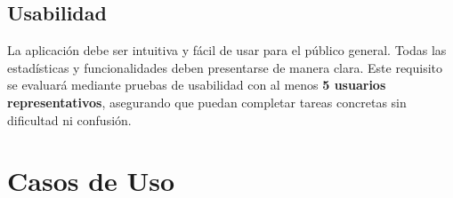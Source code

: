 \subsection*{Usabilidad}

La aplicación debe ser intuitiva y fácil de usar para el público general. Todas las estadísticas y funcionalidades deben presentarse de manera clara. Este requisito se evaluará mediante pruebas de usabilidad con al menos \textbf{5 usuarios representativos}, asegurando que puedan completar tareas concretas sin dificultad ni confusión.


\section{Casos de Uso}


